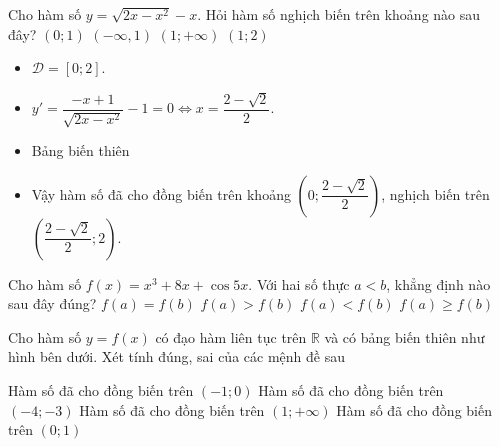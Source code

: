 \begin{ex}%
 Cho hàm số $y=\sqrt{2x-x^2}-x$. Hỏi hàm số nghịch biến trên khoảng nào sau đây?
 \choice
 {$(0 ; 1)$}
 {$(-\infty, 1)$}
 {$(1 ;+\infty)$}
 {\True $(1 ; 2)$}
 \loigiai
 {
 \begin{itemize}
 \item $\mathscr{D}=[0;2]$.
 \item $y'=\dfrac{-x+1}{\sqrt{2x-x^2}}-1=0\Leftrightarrow x=\dfrac{2-\sqrt{2}}{2}$.
 \item Bảng biến thiên
 \begin{center}
 \end{center}
 \item 	Vậy hàm số đã cho đồng biến trên khoảng $\left(0;\dfrac{2-\sqrt{2}}{2}\right)$, nghịch biến trên $\left(\dfrac{2-\sqrt{2}}{2};2\right)$.
 \end{itemize}
 }
\end{ex}
\begin{ex}%
 Cho hàm số $f(x)=x^3+8x+\cos5x$. Với hai số thực $a<b$, khẳng định nào sau đây đúng?
 \choice
 {$f(a)=f(b)$}
 {$f(a)>f(b)$}
 {\True $f(a)<f(b)$}
 {$f(a)\ge f(b)$}
\end{ex}
\BTTF
\begin{ex}%
    Cho hàm số $y = f(x)$ có đạo hàm liên tục trên $\mathbb{R}$ và có bảng biến thiên như hình bên dưới. Xét tính đúng, sai của các mệnh đề sau
    \begin{center}
    \end{center}
    \choiceTF
    {\True Hàm số đã cho đồng biến trên $ (-1; 0) $}
    {Hàm số đã cho đồng biến trên $ (-4; -3) $}
    {\True Hàm số đã cho đồng biến trên $ (1;+\infty) $}
    {Hàm số đã cho đồng biến trên $ (0; 1) $}
\end{ex}
